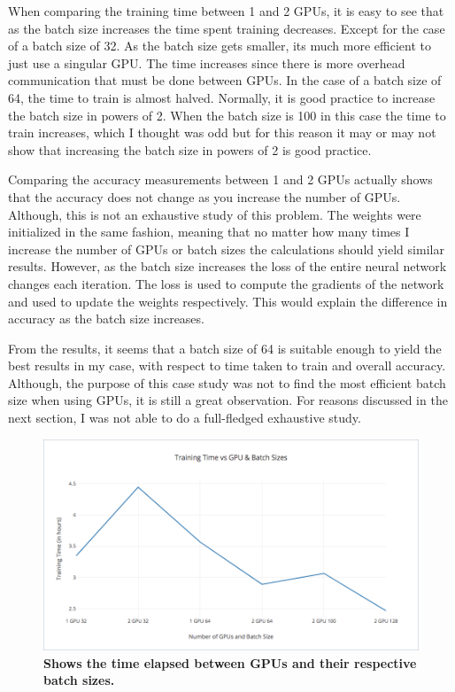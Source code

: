 \documentclass[12pt,conference]{ieeeconf}
\begin{document}
	When comparing the training time between 1 and 2 GPUs, it is easy to see that as the batch size increases the time spent training decreases. Except for the case of a batch size of 32. As the batch size gets smaller, its much more efficient to just use a singular GPU. The time increases since there is more overhead communication that must be done between GPUs. In the case of a batch size of 64, the time to train is almost halved. Normally, it is good practice to increase the batch size in powers of 2. When the batch size is 100 in this case the time to train increases, which I thought was odd but for this reason it may or may not show that increasing the batch size in powers of 2 is good practice.
	
	Comparing the accuracy measurements between 1 and 2 GPUs actually shows that the accuracy does not change as you increase the number of GPUs. Although, this is not an exhaustive study of this problem. The weights were initialized in the same fashion, meaning that no matter how many times I increase the number of GPUs or batch sizes the calculations should yield similar results. However, as the batch size increases the loss of the entire neural network changes each iteration. The loss is used to compute the gradients of the network and used to update the weights respectively. This would explain the difference in accuracy as the batch size increases.
	
	From the results, it seems that a batch size of 64 is suitable enough to yield the best results in my case, with respect to time taken to train and overall accuracy. Although, the purpose of this case study was not to find the most efficient batch size when using GPUs, it is still a great observation. For reasons discussed in the next section, I was not able to do a full-fledged exhaustive study. 
	
\begin{figure}
\begin{center}
\includegraphics[width=2.0\columnwidth]{TrainingTime}
\end{center}
	\caption{\textbf{Shows the time elapsed between GPUs and their respective batch sizes.}}
\label{fig:TT}
\end{figure}
\end{document}
